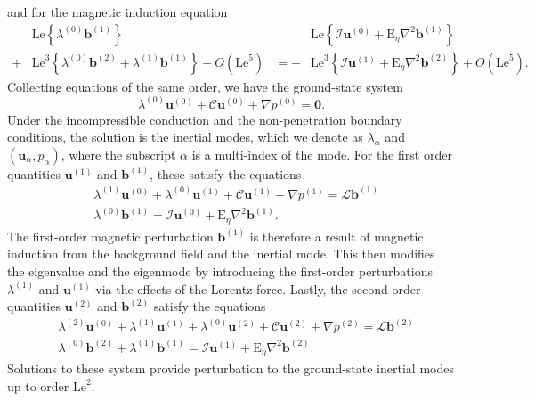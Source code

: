 %
and for the magnetic induction equation
%
\begin{equation}
\begin{aligned}
    &\mathrm{Le}\left\{\lambda^{(0)} \mathbf{b}^{(1)}\right\} & & \mathrm{Le} \left\{\mathcal{I} \mathbf{u}^{(0)} + \mathrm{E}_\eta \nabla^2 \mathbf{b}^{(1)}\right\} \\
    + &\mathrm{Le}^3 \left\{\lambda^{(0)} \mathbf{b}^{(2)} + \lambda^{(1)} \mathbf{b}^{(1)}\right\} + O\left(\mathrm{Le}^5\right) & = + & \mathrm{Le}^3 \left\{\mathcal{I} \mathbf{u}^{(1)} + \mathrm{E}_\eta \nabla^2 \mathbf{b}^{(2)}\right\} + O\left(\mathrm{Le}^5\right).
\end{aligned}
\end{equation}
%
Collecting equations of the same order, we have the ground-state system
%
\begin{equation}
    \lambda^{(0)} \mathbf{u}^{(0)} + \mathcal{C} \mathbf{u}^{(0)} + \nabla p^{(0)} = \mathbf{0}.
\end{equation}
%
Under the incompressible conduction and the non-penetration boundary conditions, the solution is the inertial modes, which we denote as $\lambda_\alpha$ and $(\mathbf{u}_{\alpha}, p_{\alpha})$, where the subscript $\alpha$ is a multi-index of the mode. For the first order quantities $\mathbf{u}^{(1)}$ and $\mathbf{b}^{(1)}$, these satisfy the equations
%
\begin{equation}
\begin{aligned}
    &\lambda^{(1)} \mathbf{u}^{(0)} + \lambda^{(0)} \mathbf{u}^{(1)} + \mathcal{C} \mathbf{u}^{(1)} + \nabla p^{(1)} = \mathcal{L} \mathbf{b}^{(1)} \\
    &\lambda^{(0)} \mathbf{b}^{(1)} = \mathcal{I} \mathbf{u}^{(0)} + \mathrm{E}_\eta \nabla^2 \mathbf{b}^{(1)}.
\end{aligned}
\end{equation}
%
The first-order magnetic perturbation $\mathbf{b}^{(1)}$ is therefore a result of magnetic induction from the background field and the inertial mode. This then modifies the eigenvalue and the eigenmode by introducing the first-order perturbations $\lambda^{(1)}$ and $\mathbf{u}^{(1)}$ via the effects of the Lorentz force.
Lastly, the second order quantities $\mathbf{u}^{(2)}$ and $\mathbf{b}^{(2)}$ satisfy the equations 
%
\begin{equation}
    \begin{aligned}
        &\lambda^{(2)} \mathbf{u}^{(0)} + \lambda^{(1)} \mathbf{u}^{(1)} + \lambda^{(0)} \mathbf{u}^{(2)} + \mathcal{C} \mathbf{u}^{(2)} + \nabla p^{(2)} = \mathcal{L} \mathbf{b}^{(2)} \\
        &\lambda^{(0)} \mathbf{b}^{(2)} + \lambda^{(1)} \mathbf{b}^{(1)} = \mathcal{I} \mathbf{u}^{(1)} + \mathrm{E}_\eta \nabla^2 \mathbf{b}^{(2)}.
    \end{aligned}
\end{equation}
%
Solutions to these system provide perturbation to the ground-state inertial modes up to order $\mathrm{Le}^2$.


